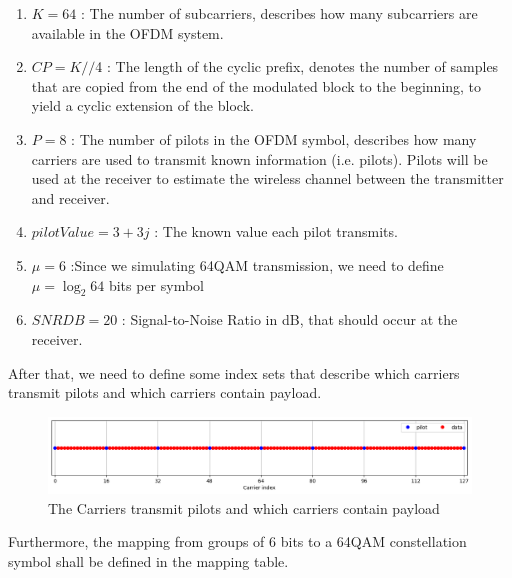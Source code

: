 \begin{enumerate}
    \item $K = 64$ : The number of subcarriers, describes how many subcarriers are available in the OFDM system.
    \item $CP = K//$4 : The length of the cyclic prefix, denotes the number of samples that are copied from the end of the modulated block to the beginning, to yield a cyclic extension of the block.
    \item $P = 8$ : The number of pilots in the OFDM symbol, describes how many carriers are used to transmit known information (i.e. pilots). Pilots will be used at the receiver to estimate the wireless channel between the transmitter and receiver.
    \item $pilotValue = 3+3j$ : The known value each pilot transmits.
    \item $\mu = 6$ :Since we simulating 64QAM transmission, we need to define $\mu = \log_{2} 64$ bits per symbol
    \item $SNRDB = 20$ : Signal-to-Noise Ratio in dB, that should occur at the receiver.
\end{enumerate}

After that, we need to define some index sets that describe which carriers transmit pilots and which carriers contain payload.

\begin{figure}[htbp]
    \centering
    \includegraphics[width=\linewidth]{../Source/results/carrier_index}
    \caption{The Carriers transmit pilots and which carriers contain payload}
    \label{carrier_index}
\end{figure}

Furthermore, the mapping from groups of 6 bits to a 64QAM constellation symbol shall be defined in the mapping table.

